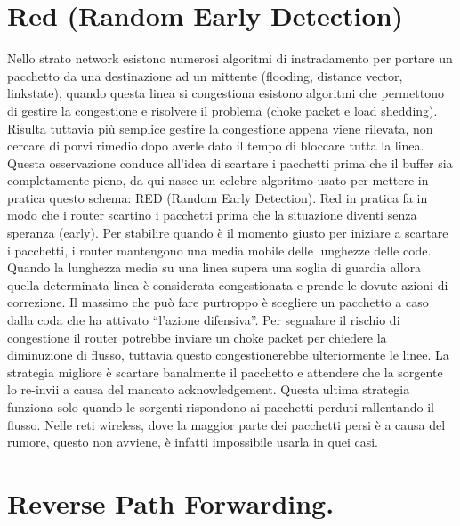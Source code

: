 \section{Red (Random Early Detection)}

Nello strato network esistono numerosi algoritmi di instradamento per portare un pacchetto da una destinazione ad un mittente (flooding, distance vector, linkstate), quando questa linea si congestiona esistono algoritmi che permettono di gestire la congestione e risolvere il problema (choke packet e load shedding). Risulta tuttavia più semplice gestire la congestione appena viene rilevata, non cercare di porvi rimedio dopo averle dato il tempo di bloccare tutta la linea.
Questa osservazione conduce all’idea di scartare i pacchetti prima che il buffer sia completamente pieno, da qui nasce un celebre algoritmo usato per mettere in pratica questo schema: RED (Random Early Detection).
Red in pratica fa in modo che i router scartino i pacchetti prima che la situazione diventi senza speranza (early). Per stabilire quando è il momento giusto per iniziare a scartare i pacchetti, i router mantengono una media mobile delle lunghezze delle code. Quando la lunghezza media su una linea supera una soglia di guardia allora quella determinata linea è considerata congestionata e prende le dovute azioni di correzione. Il massimo che può fare purtroppo è scegliere un pacchetto a caso dalla coda che ha attivato “l’azione difensiva”. Per segnalare il rischio di congestione il router potrebbe inviare un choke packet per chiedere la diminuzione di flusso, tuttavia questo congestionerebbe ulteriormente le linee. La strategia migliore è scartare banalmente il pacchetto e attendere che la sorgente lo re-invii a causa del mancato acknowledgement. Questa ultima strategia funziona solo quando le sorgenti rispondono ai pacchetti perduti rallentando il flusso. Nelle reti wireless, dove la maggior parte dei pacchetti persi è a causa del rumore, questo non avviene, è infatti impossibile usarla in quei casi.

\section{Reverse Path Forwarding.}

